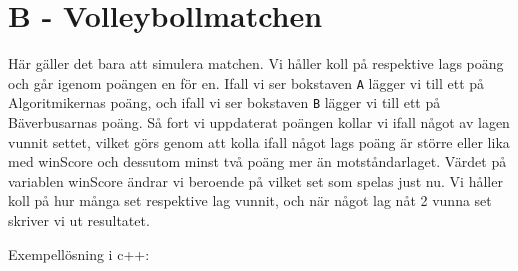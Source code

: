 \section*{B - Volleybollmatchen}

Här gäller det bara att simulera matchen. Vi håller koll på respektive lags poäng och går igenom poängen en för en. Ifall vi ser bokstaven \texttt{A} lägger vi till ett på Algoritmikernas poäng, och ifall vi ser bokstaven \texttt{B} lägger vi till ett på Bäverbusarnas poäng. Så fort vi uppdaterat poängen kollar vi ifall något av lagen vunnit settet, vilket görs genom att kolla ifall något lags poäng är större eller lika med winScore och dessutom minst två poäng mer än motståndarlaget. Värdet på variablen winScore ändrar vi beroende på vilket set som spelas just nu. Vi håller koll på hur många set respektive lag vunnit, och när något lag nåt 2 vunna set skriver vi ut resultatet. 

Exempellösning i c++:
